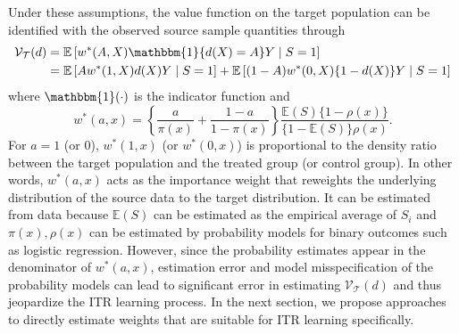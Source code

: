 \documentclass[12pt]{article}
\newcommand{\E}{\mathbb{E}}
\newcommand{\ind}{\mathbbm{1}}
\begin{document}
Under these assumptions, the value function on the target population can be identified with the observed source sample quantities through
\begin{align}
    \mathcal{V}_\mathcal{T}(d) 
    &=
    \E\left[ 
        w^*(A, X) \ind \{d(X) = A\} Y \mid S = 1
     \right]
    \nonumber
    \\&=
    \E\left[ A w^*(1, X) d(X) Y \mid S = 1 \right] + 
    \E\left[ (1-A) w^*(0, X) \{ 1-d(X) \} Y \mid S = 1 \right]
    \label{eq:weighted_estimator}
\end{align}
where $\ind(\cdot)$ is the indicator function and
\begin{equation}
    \label{def:w_star_a_x}
    w^*(a, x) = 
    \left\{\frac{a}{\pi(x)} + \frac{1-a}{1-\pi(x)} \right\}
    \frac{\E(S)\{ 1 - \rho(x)\}}{\{ 1-\E(S) \} \rho(x)} 
.\end{equation}
For $a = 1$ (or 0), $w^*(1, x)$ (or $w^*(0, x)$) is proportional to the density ratio between the target population and the treated group (or control group). In other words, $w^*(a, x)$ acts as the importance weight that reweights the underlying distribution of the source data to the target distribution. It can be estimated from data because $\E(S)$ can be estimated as the empirical average of $S_i$ and $\pi(x), \rho(x)$ can be estimated by probability models for binary outcomes such as logistic regression. However, since the probability estimates appear in the denominator of $w^*(a, x)$, estimation error and model misspecification of the probability models can lead to significant error in estimating $\mathcal{V}_\mathcal{T}(d)$ and thus jeopardize the ITR learning process. In the next section, we propose approaches to directly estimate weights that are suitable for ITR learning specifically.

\end{document}
